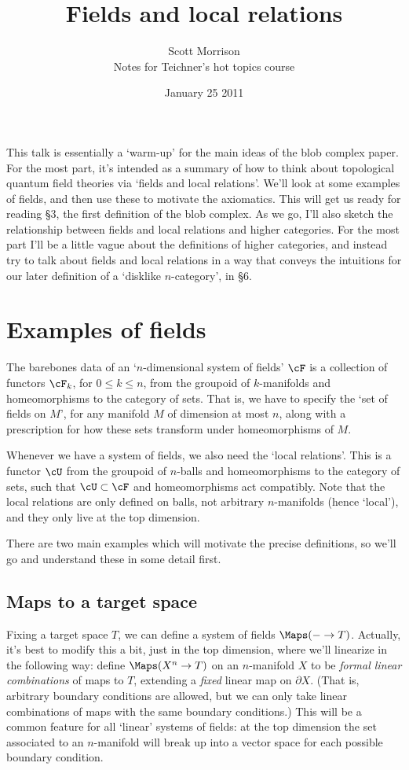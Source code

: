 \documentclass[11pt]{amsart}
\title{Fields and local relations}
\author{Scott Morrison \\ Notes for Teichner's hot topics course}
\date{January 25 2011}
\theoremstyle{plain}
\newcommand{\bdy}{\partial}
\begin{document}
\maketitle

This talk is essentially a `warm-up' for the main ideas of the blob complex paper. For the most part, it's intended as a summary of how to think about topological quantum field theories via `fields and local relations'. We'll look at some examples of fields, and then use these to motivate the axiomatics. This will get us ready for reading \S 3, the first definition of the blob complex. As we go, I'll also sketch the relationship between fields and local relations and higher categories. For the most part I'll be a little vague about the definitions of higher categories, and instead try to talk about fields and local relations in a way that conveys the intuitions for our later definition of a `disklike $n$-category', in \S 6.

\section{Examples of fields}
The barebones data of an `$n$-dimensional system of fields' $\cF$ is a collection of functors $\cF_k$, for $0 \leq k \leq n$, from the groupoid of $k$-manifolds and homeomorphisms to the category of sets. That is, we have to specify the `set of fields on $M$', for any manifold $M$ of dimension at most $n$, along with a prescription for how these sets transform under homeomorphisms of $M$.

Whenever we have a system of fields, we also need the `local relations'. This is a functor $\cU$ from the groupoid of $n$-balls and homeomorphisms to the category of sets, such that $\cU \subset \cF$ and homeomorphisms act compatibly. Note that the local relations are only defined on balls, not arbitrary $n$-manifolds (hence `local'), and they only live at the top dimension.

There are two main examples which will motivate the precise definitions, so we'll go and understand these in some detail first.

\subsection{Maps to a target space}
Fixing a target space $T$, we can define a system of fields $\Maps(- \to T)$. Actually, it's best to modify this a bit, just in the top dimension, where we'll linearize in the following way: define $\Maps(X^n \to T)$ on an $n$-manifold $X$ to be \emph{formal linear combinations} of maps to $T$, extending a \emph{fixed} linear map on $\bdy X$. (That is, arbitrary boundary conditions are allowed, but we can only take linear combinations of maps with the same boundary conditions.) This will be a common feature for all `linear' systems of fields: at the top dimension the set associated to an $n$-manifold will break up into a vector space for each possible boundary condition.
\end{document}
